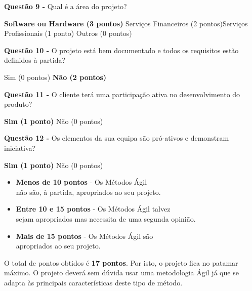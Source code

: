 \begin{framed}
\newline\textbf{Questão 9 - } Qual é a área do projeto?
\newline \begin{center} \textbf{Software ou Hardware (3 pontos)}\hspace{17mm} Serviços Financeiros (2 pontos)\hspace{17mm}Serviços Profissionais (1 ponto)\hspace{17mm} Outros (0 pontos)\end{center}
\vspace{2mm}
\newline\textbf{Questão 10 - } O projeto está bem documentado e todos os requisitos estão definidos à partida?
\newline \begin{center} Sim (0 pontos) \hspace{30mm} \textbf{Não (2 pontos)}\end{center}
\vspace{2mm}
\newline\textbf{Questão 11 - } O cliente terá uma participação ativa no desenvolvimento do produto?
\newline \begin{center} \textbf{Sim (1 ponto)} \hspace{30mm} Não (0 pontos)\end{center}
\vspace{2mm}
\newline\textbf{Questão 12 - } Os elementos da sua equipa são pró-ativos e demonstram iniciativa?
\newline \begin{center} \textbf{Sim (1 ponto)} \hspace{30mm} Não (0 pontos)\end{center}

\vspace{10mm}
\begin{center}
\begin{itemize}
    \item \textbf{Menos de 10 pontos} - Os Métodos Ágil \\não são, à partida, apropriados ao seu projeto.
    \item \textbf{Entre 10 e 15 pontos} - Os Métodos Ágil talvez \\sejam apropriados mas necessita de uma segunda opinião.
    \item \textbf{Mais de 15 pontos} - Os Métodos Ágil são\\ apropriados ao seu projeto.
\end{itemize}
\end{center}
\end{framed}

O total de pontos obtidos é \textbf{17 pontos}. Por isto, o projeto fica no patamar máximo. O projeto deverá sem dúvida usar uma metodologia Ágil já que se adapta às principais características deste tipo de método.